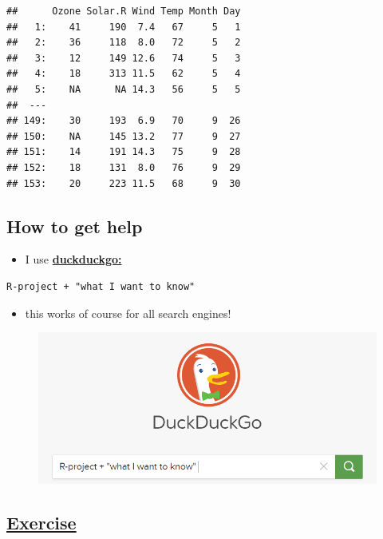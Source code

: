 \documentclass[10pt,]{article}
\providecommand{\tightlist}{%
  \setlength{\itemsep}{0pt}\setlength{\parskip}{0pt}}
\begin{document}
\begin{verbatim}
##      Ozone Solar.R Wind Temp Month Day
##   1:    41     190  7.4   67     5   1
##   2:    36     118  8.0   72     5   2
##   3:    12     149 12.6   74     5   3
##   4:    18     313 11.5   62     5   4
##   5:    NA      NA 14.3   56     5   5
##  ---                                  
## 149:    30     193  6.9   70     9  26
## 150:    NA     145 13.2   77     9  27
## 151:    14     191 14.3   75     9  28
## 152:    18     131  8.0   76     9  29
## 153:    20     223 11.5   68     9  30
\end{verbatim}

\subsection{How to get help}\label{how-to-get-help}

\begin{itemize}
\tightlist
\item
  I use \href{figure/duckduckgo.PNG}{\textbf{duckduckgo:}}
\end{itemize}

\begin{verbatim}
R-project + "what I want to know" 
\end{verbatim}

\begin{itemize}
\tightlist
\item
  this works of course for all search engines!
\end{itemize}

\begin{figure}
\centering
\includegraphics{figure/duckduckgo.PNG}
\caption{}
\end{figure}

\subsection{\texorpdfstring{\href{https://www.datacamp.com/community/tutorials/pipe-r-tutorial}{Exercise}}{Exercise}}\label{exercise-1}
\end{document}
